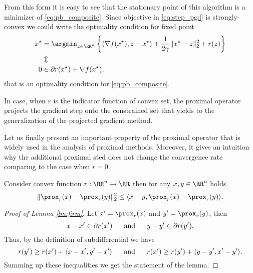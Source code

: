 {\color{yellow}
From this form it is easy to see that the stationary point of this algorithm is a minimizer of \eqref{eq:pb_composite}. Since objective in \eqref{eq:step_pgd} is strongly-convex we could write the optimality condition for fixed point
\begin{align*}
x^\star &= \argmin_{z\in\RR^n}\left\{\langle\nabla f(x^\star), z-x^\star\rangle+\frac{1}{2\gamma}\|x^\star-z\|_2^2 + r(z)\right\}\\
&\Updownarrow\\
0&\in \partial r(x^\star) + \nabla f(x^\star),
\end{align*}
that is an optimality condition for \eqref{eq:pb_composite}.}

In case, when $r$ is the indicator function of convex set, the proximal operator projects the gradient step onto the constrained set that yields to the generalization of the projected gradient method. 


Let us finally present an important property of the proximal operator that is widely used in the analysis of proximal methods. Moreover, it gives an intuition why the additional proximal sted does not change the convergence rate comparing to the case when $r=0$.

\begin{lemma}\label{lm:firm}
Consider convex function $r:\RR^n\rightarrow \RR$ then for any $x, y\in \RR^n$ holds
\begin{equation}\label{eq:firm}
\|\prox_r(x)-\prox_r(y)\|_2^2\leq\langle x-y, \prox_r(x)-\prox_r(y)\rangle.
\end{equation}
\end{lemma}
\begin{proof}[Proof of Lemma \ref{lm:firm}]
Let $x^\prime = \prox_r(x)$ and $y^\prime = \prox_r(y)$, then 
$$
x - x^\prime\in\partial r(x^\prime)~~~~~\textnormal{and}~~~~~y - y^\prime \in\partial r(y^\prime).
$$
Thus, by the definition of subdifferential we have 
$$
r(y^\prime)\geq r(x^\prime) + \langle x - x^\prime, y^\prime- x^\prime\rangle~~~~~\textnormal{and}~~~~~r(x^\prime)\geq r(y^\prime) + \langle y - y^\prime, x^\prime- y^\prime\rangle.
$$
Summing up these inequalities we get the statement of the lemma.
\end{proof}


